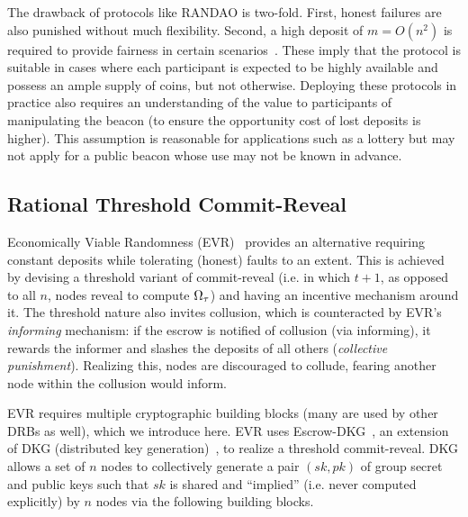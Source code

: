 The drawback of protocols like RANDAO is two-fold. First, honest failures are also punished without much flexibility. Second, a high deposit of $m = O(n^2)$ is required to provide fairness in certain scenarios~\cite{andrychowicz2014secure, bentov2014use}. These imply that the protocol is suitable in cases where each participant is expected to be highly available and possess an ample supply of coins, but not otherwise.
Deploying these protocols in practice also requires an understanding of the value to participants of manipulating the beacon (to ensure the opportunity cost of lost deposits is higher). This assumption is reasonable for applications such as a lottery but may not apply for a public beacon whose use may not be known in advance.


\subsection{Rational Threshold Commit-Reveal}
Economically Viable Randomness (EVR)~\cite{david2020economically} provides an alternative requiring constant deposits while tolerating (honest) faults to an extent. This is achieved by devising a threshold variant of commit-reveal (i.e. in which $t + 1$, as opposed to all $n$, nodes reveal to compute $\Omega_\tau$) and having an incentive mechanism around it. The threshold nature also invites collusion, which is counteracted by EVR's \textit{informing} mechanism: if the escrow is notified of collusion (via informing), it rewards the informer and slashes the deposits of all others (\textit{collective punishment}). Realizing this, nodes are discouraged to collude, fearing another node within the collusion would inform.

EVR requires multiple cryptographic building blocks (many are used by other DRBs as well), which we introduce here. EVR uses Escrow-DKG~\cite{david2019rational}, an extension of DKG (distributed key generation)~\cite{pedersen1991threshold,gennaro1999secure}, to realize a threshold commit-reveal. DKG allows a set of $n$ nodes to collectively generate a pair $(sk, pk)$ of group secret and public keys such that $sk$ is shared and ``implied'' (i.e. never computed explicitly) by $n$ nodes via the following building blocks.

